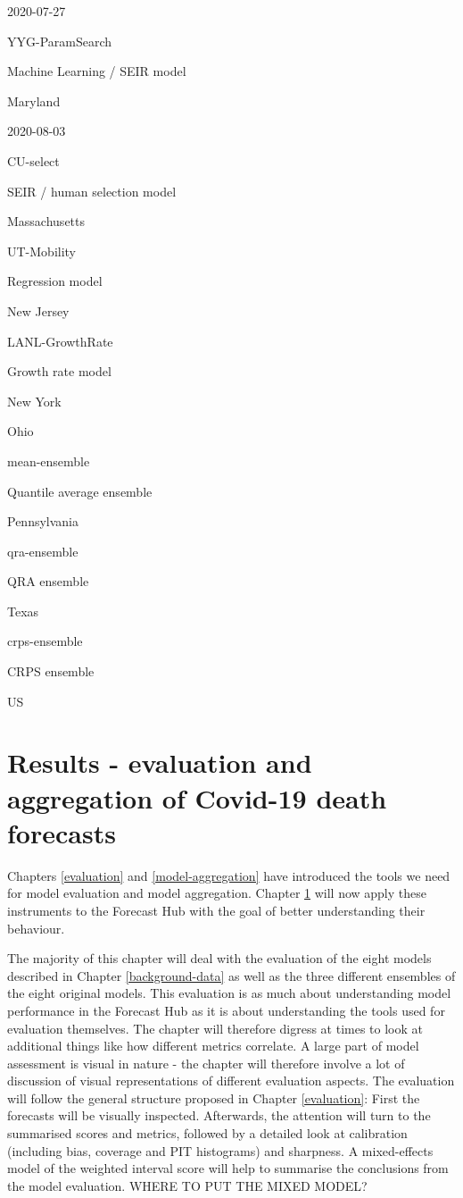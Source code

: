 \documentclass[
]{book}
\begin{document}
2020-07-27

YYG-ParamSearch

Machine Learning / SEIR model

Maryland

2020-08-03

CU-select

SEIR / human selection model

Massachusetts

UT-Mobility

Regression model

New Jersey

LANL-GrowthRate

Growth rate model

New York

Ohio

mean-ensemble

Quantile average ensemble

Pennsylvania

qra-ensemble

QRA ensemble

Texas

crps-ensemble

CRPS ensemble

US

\hypertarget{results}{%
\chapter{Results - evaluation and aggregation of Covid-19 death forecasts}\label{results}}

Chapters \ref{evaluation} and \ref{model-aggregation} have introduced the tools we need for model evaluation and model aggregation. Chapter \ref{results} will now apply these instruments to the Forecast Hub with the goal of better understanding their behaviour.

The majority of this chapter will deal with the evaluation of the eight models described in Chapter \ref{background-data} as well as the three different ensembles of the eight original models. This evaluation is as much about understanding model performance in the Forecast Hub as it is about understanding the tools used for evaluation themselves. The chapter will therefore digress at times to look at additional things like how different metrics correlate. A large part of model assessment is visual in nature - the chapter will therefore involve a lot of discussion of visual representations of different evaluation aspects. The evaluation will follow the general structure proposed in Chapter \ref{evaluation}: First the forecasts will be visually inspected. Afterwards, the attention will turn to the summarised scores and metrics, followed by a detailed look at calibration (including bias, coverage and PIT histograms) and sharpness. A mixed-effects model of the weighted interval score will help to summarise the conclusions from the model evaluation. WHERE TO PUT THE MIXED MODEL?
\end{document}
